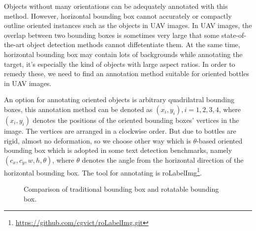 Objects without many orientations can be adequately annotated with this method. However, horizontal bounding box cannot accurately or compactly outline oriented instances such as the objects in UAV images. In UAV images, the overlap between two bounding boxes is sometimes very large that some state-of-the-art object detection methods cannot diffetentiate them\cite{DOTA}. At the same time, horizontal bounding box may contain lots of backgrounds while annotating the target, it's especially the kind of objects with large aspect ratios. In order to remedy these, we need to find an annotation method suitable for oriented bottles in UAV images.

An option for annotating oriented objects is arbitrary quadrilatral bounding boxes, this annotation method can be denoted as ${(x_i, y_i), i=1,2,3,4}$, where $(x_i, y_i)$ denotes the positions of the oriented bounding boxes' vertices in the image\cite{DOTA}. The vertices are arranged in a clockwise order. But due to bottles are rigid, almost no deformation, so we choose other way which is $\theta$-based oriented bounding box which is adopted in some text detection benchmarks, namely $(c_x, c_y, w, h, \theta)$, where $\theta$ denotes the angle from the horizontal direction of the horizontal bounding box\cite{DOTA}. The tool for annotating is roLabelImg\footnote{\url{https://github.com/cgvict/roLabelImg.git}}.

\begin{figure}
	\centering
	\caption{Comparison of traditional bounding box and rotatable bounding box. }
\end{figure}



